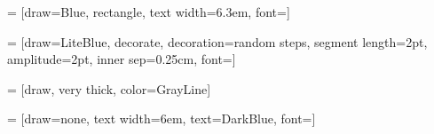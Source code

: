


 = [draw=Blue,
                    rectangle,
                    text width=6.3em,
                    font=\scriptsize]

 = [draw=LiteBlue,
                       decorate,
                       decoration={random steps,
                                   segment length=2pt,
                                   amplitude=2pt},
                       inner sep=0.25cm,
                       font=\scriptsize]

 = [draw,
                        very thick,
                        color=GrayLine]

 = [draw=none,
                          text width=6em,
                          text=DarkBlue,
                          font=\small]

